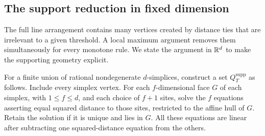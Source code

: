 \subsection{The support reduction in fixed dimension}
The full line arrangement contains many vertices created by distance ties that are irrelevant to a given threshold. A local maximum argument removes them simultaneously for every monotone rule. We state the argument in $\mathbb R^d$ to make the supporting geometry explicit.

For a finite union of rational nondegenerate $d$-simplices, construct a set $Q_T^{\mathrm{supp}}$ as follows. Include every simplex vertex. For each $f$-dimensional face $G$ of each simplex, with $1\le f\le d$, and each choice of $f+1$ sites, solve the $f$ equations asserting equal squared distance to those sites, restricted to the affine hull of $G$. Retain the solution if it is unique and lies in $G$. All these equations are linear after subtracting one squared-distance equation from the others.

